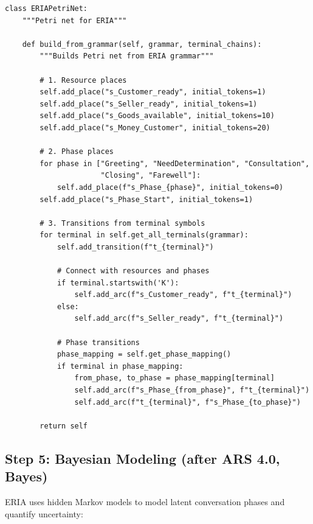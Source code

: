 \documentclass[12pt,a4paper]{article}
\begin{document}
\begin{lstlisting}[caption=Petri net construction in ERIA]
class ERIAPetriNet:
    """Petri net for ERIA"""
    
    def build_from_grammar(self, grammar, terminal_chains):
        """Builds Petri net from ERIA grammar"""
        
        # 1. Resource places
        self.add_place("s_Customer_ready", initial_tokens=1)
        self.add_place("s_Seller_ready", initial_tokens=1)
        self.add_place("s_Goods_available", initial_tokens=10)
        self.add_place("s_Money_Customer", initial_tokens=20)
        
        # 2. Phase places
        for phase in ["Greeting", "NeedDetermination", "Consultation", 
                      "Closing", "Farewell"]:
            self.add_place(f"s_Phase_{phase}", initial_tokens=0)
        self.add_place("s_Phase_Start", initial_tokens=1)
        
        # 3. Transitions from terminal symbols
        for terminal in self.get_all_terminals(grammar):
            self.add_transition(f"t_{terminal}")
            
            # Connect with resources and phases
            if terminal.startswith('K'):
                self.add_arc(f"s_Customer_ready", f"t_{terminal}")
            else:
                self.add_arc(f"s_Seller_ready", f"t_{terminal}")
            
            # Phase transitions
            phase_mapping = self.get_phase_mapping()
            if terminal in phase_mapping:
                from_phase, to_phase = phase_mapping[terminal]
                self.add_arc(f"s_Phase_{from_phase}", f"t_{terminal}")
                self.add_arc(f"t_{terminal}", f"s_Phase_{to_phase}")
        
        return self
\end{lstlisting}

\subsection{Step 5: Bayesian Modeling (after ARS 4.0, Bayes)}

ERIA uses hidden Markov models to model latent conversation phases and quantify uncertainty:
\end{document}
